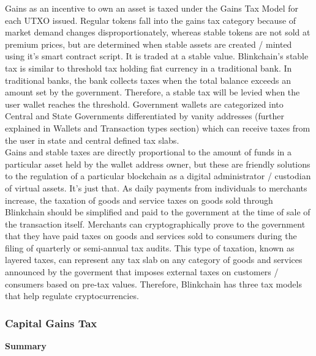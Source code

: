 \documentclass[letterpaper,11pt]{article}
\begin{document}
Gains as an incentive to own an asset is taxed under the Gains Tax Model for each UTXO issued. Regular tokens fall into the gains tax category because of market demand changes disproportionately, whereas stable tokens are not sold at premium prices, but are determined when stable assets are created / minted using it's smart contract script. It is traded at a stable value. Blinkchain's stable tax is similar to threshold tax holding fiat currency in a traditional bank. In traditional banks, the bank collects taxes when the total balance exceeds an amount set by the government. Therefore, a stable tax will be levied when the user wallet reaches the threshold. Government wallets are categorized into Central and State Governments differentiated by vanity addresses (further explained in Wallets and Transaction types section) which can receive taxes from the user in state and central defined tax slabs.\\

Gains and stable taxes are directly proportional to the amount of funds in a particular asset held by the wallet address owner, but these are friendly solutions to the regulation of a particular blockchain as a digital administrator / custodian of virtual assets. It's just that. As daily payments from individuals to merchants increase, the taxation of goods and service taxes on goods sold through Blinkchain should be simplified and paid to the government at the time of sale of the transaction itself. Merchants can cryptographically prove to the government that they have paid taxes on goods and services sold to  consumers during the filing of quarterly or semi-annual tax audits. This type of taxation, known as layered taxes, can represent any tax slab on any category of goods and services announced by the goverment that imposes  external taxes on customers / consumers based on  pre-tax values. Therefore, Blinkchain has three tax models that help regulate cryptocurrencies.

\subsubsection{Capital Gains Tax}

\textbf{Summary}\\
\end{document}
